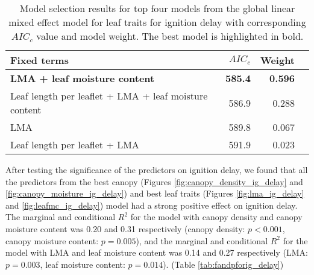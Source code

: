 \documentclass{bmcart}
\begin{document}
\begin{table}
  \centering
  \caption{Model selection results for top four models from the global linear
    mixed effect model for leaf traits for ignition delay with corresponding
    $AIC_{c}$ value and model weight. The best model is highlighted in bold.}
  \begin{tabular}{lrrr}
    \toprule
    \textbf{Fixed terms} & $AIC_{c}$ & \textbf{Weight}\\
    \midrule
    \textbf{LMA + leaf moisture content}    & \textbf{585.4} & \textbf{0.596} \\
    Leaf length per leaflet + LMA + leaf moisture content & 586.9          & 0.288          \\
    LMA                                                   & 589.8          & 0.067          \\
    Leaf length per leaflet + LMA                         & 591.9          & 0.023          \\
    \bottomrule
  \end{tabular}
  \label{tab:leaf_models_ignition_delay}
\end{table}
After testing the significance of the predictors on ignition delay, we found that all the predictors from the best canopy (Figures \ref{fig:canopy_density_ig_delay} and \ref{fig:canopy_moisture_ig_delay}) and best leaf traits (Figures \ref{fig:lma_ig_delay} and \ref{fig:leafmc_ig_delay}) model had a strong positive effect on ignition delay. The marginal and conditional $R^2$ for the model with canopy density and canopy moisture content was 0.20 and 0.31 respectively (canopy density: $p < 0.001$, canopy moisture content: $p = 0.005$), and the marginal and conditional $R^2$ for the model with LMA and leaf moisture content was 0.14 and 0.27 respectively (LMA: $p = 0.003$, leaf moisture content: $p = 0.014$). (Table \ref{tab:fandpforig_delay})
\end{document}

